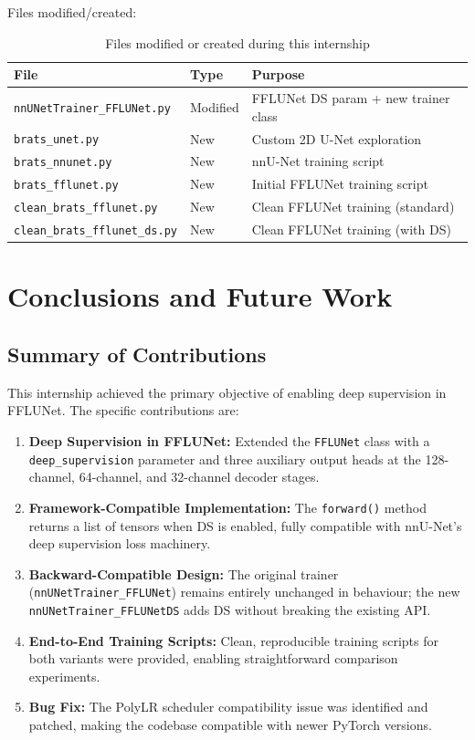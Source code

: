 \documentclass[12pt,a4paper]{report}
\begin{document}
Files modified/created:

\begin{table}[H]
\centering
\caption{Files modified or created during this internship}
\label{tab:files}
\begin{tabular}{lll}
\toprule
\textbf{File} & \textbf{Type} & \textbf{Purpose} \\
\midrule
\texttt{nnUNetTrainer\_FFLUNet.py} & Modified & FFLUNet DS param + new trainer class \\
\texttt{brats\_unet.py} & New & Custom 2D U-Net exploration \\
\texttt{brats\_nnunet.py} & New & nnU-Net training script \\
\texttt{brats\_fflunet.py} & New & Initial FFLUNet training script \\
\texttt{clean\_brats\_fflunet.py} & New & Clean FFLUNet training (standard) \\
\texttt{clean\_brats\_fflunet\_ds.py} & New & Clean FFLUNet training (with DS) \\
\bottomrule
\end{tabular}
\end{table}

\chapter{Conclusions and Future Work}

\section{Summary of Contributions}

This internship achieved the primary objective of enabling deep supervision in FFLUNet. The specific contributions are:

\begin{enumerate}[leftmargin=*]
    \item \textbf{Deep Supervision in FFLUNet:} Extended the \texttt{FFLUNet} class with a \texttt{deep\_supervision} parameter and three auxiliary output heads at the 128-channel, 64-channel, and 32-channel decoder stages.
    \item \textbf{Framework-Compatible Implementation:} The \texttt{forward()} method returns a list of tensors when DS is enabled, fully compatible with nnU-Net's deep supervision loss machinery.
    \item \textbf{Backward-Compatible Design:} The original trainer (\texttt{nnUNetTrainer\_FFLUNet}) remains entirely unchanged in behaviour; the new \texttt{nnUNetTrainer\_FFLUNetDS} adds DS without breaking the existing API.
    \item \textbf{End-to-End Training Scripts:} Clean, reproducible training scripts for both variants were provided, enabling straightforward comparison experiments.
    \item \textbf{Bug Fix:} The PolyLR scheduler compatibility issue was identified and patched, making the codebase compatible with newer PyTorch versions.
\end{enumerate}
\end{document}
